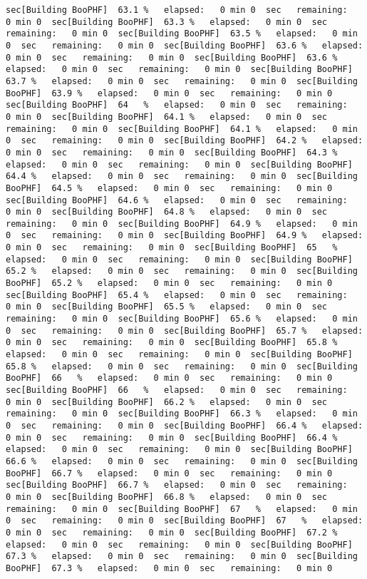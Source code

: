\documentclass[
]{book}
\begin{document}
\begin{verbatim}
sec[Building BooPHF]  63.1 %   elapsed:   0 min 0  sec   remaining:   0 min 0  sec[Building BooPHF]  63.3 %   elapsed:   0 min 0  sec   remaining:   0 min 0  sec[Building BooPHF]  63.5 %   elapsed:   0 min 0  sec   remaining:   0 min 0  sec[Building BooPHF]  63.6 %   elapsed:   0 min 0  sec   remaining:   0 min 0  sec[Building BooPHF]  63.6 %   elapsed:   0 min 0  sec   remaining:   0 min 0  sec[Building BooPHF]  63.7 %   elapsed:   0 min 0  sec   remaining:   0 min 0  sec[Building BooPHF]  63.9 %   elapsed:   0 min 0  sec   remaining:   0 min 0  sec[Building BooPHF]  64   %   elapsed:   0 min 0  sec   remaining:   0 min 0  sec[Building BooPHF]  64.1 %   elapsed:   0 min 0  sec   remaining:   0 min 0  sec[Building BooPHF]  64.1 %   elapsed:   0 min 0  sec   remaining:   0 min 0  sec[Building BooPHF]  64.2 %   elapsed:   0 min 0  sec   remaining:   0 min 0  sec[Building BooPHF]  64.3 %   elapsed:   0 min 0  sec   remaining:   0 min 0  sec[Building BooPHF]  64.4 %   elapsed:   0 min 0  sec   remaining:   0 min 0  sec[Building BooPHF]  64.5 %   elapsed:   0 min 0  sec   remaining:   0 min 0  sec[Building BooPHF]  64.6 %   elapsed:   0 min 0  sec   remaining:   0 min 0  sec[Building BooPHF]  64.8 %   elapsed:   0 min 0  sec   remaining:   0 min 0  sec[Building BooPHF]  64.9 %   elapsed:   0 min 0  sec   remaining:   0 min 0  sec[Building BooPHF]  64.9 %   elapsed:   0 min 0  sec   remaining:   0 min 0  sec[Building BooPHF]  65   %   elapsed:   0 min 0  sec   remaining:   0 min 0  sec[Building BooPHF]  65.2 %   elapsed:   0 min 0  sec   remaining:   0 min 0  sec[Building BooPHF]  65.2 %   elapsed:   0 min 0  sec   remaining:   0 min 0  sec[Building BooPHF]  65.4 %   elapsed:   0 min 0  sec   remaining:   0 min 0  sec[Building BooPHF]  65.5 %   elapsed:   0 min 0  sec   remaining:   0 min 0  sec[Building BooPHF]  65.6 %   elapsed:   0 min 0  sec   remaining:   0 min 0  sec[Building BooPHF]  65.7 %   elapsed:   0 min 0  sec   remaining:   0 min 0  sec[Building BooPHF]  65.8 %   elapsed:   0 min 0  sec   remaining:   0 min 0  sec[Building BooPHF]  65.8 %   elapsed:   0 min 0  sec   remaining:   0 min 0  sec[Building BooPHF]  66   %   elapsed:   0 min 0  sec   remaining:   0 min 0  sec[Building BooPHF]  66   %   elapsed:   0 min 0  sec   remaining:   0 min 0  sec[Building BooPHF]  66.2 %   elapsed:   0 min 0  sec   remaining:   0 min 0  sec[Building BooPHF]  66.3 %   elapsed:   0 min 0  sec   remaining:   0 min 0  sec[Building BooPHF]  66.4 %   elapsed:   0 min 0  sec   remaining:   0 min 0  sec[Building BooPHF]  66.4 %   elapsed:   0 min 0  sec   remaining:   0 min 0  sec[Building BooPHF]  66.6 %   elapsed:   0 min 0  sec   remaining:   0 min 0  sec[Building BooPHF]  66.7 %   elapsed:   0 min 0  sec   remaining:   0 min 0  sec[Building BooPHF]  66.7 %   elapsed:   0 min 0  sec   remaining:   0 min 0  sec[Building BooPHF]  66.8 %   elapsed:   0 min 0  sec   remaining:   0 min 0  sec[Building BooPHF]  67   %   elapsed:   0 min 0  sec   remaining:   0 min 0  sec[Building BooPHF]  67   %   elapsed:   0 min 0  sec   remaining:   0 min 0  sec[Building BooPHF]  67.2 %   elapsed:   0 min 0  sec   remaining:   0 min 0  sec[Building BooPHF]  67.3 %   elapsed:   0 min 0  sec   remaining:   0 min 0  sec[Building BooPHF]  67.3 %   elapsed:   0 min 0  sec   remaining:   0 min 0  
\end{verbatim}
\end{document}
